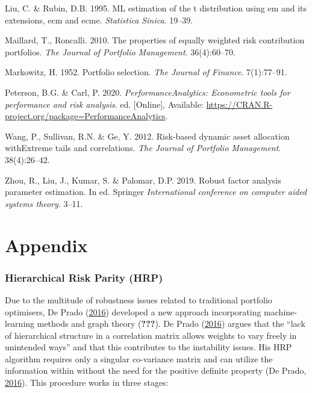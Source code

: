 \documentclass[11pt,preprint, authoryear]{elsarticle}
\numberwithin{equation}{section}
\numberwithin{figure}{section}
\numberwithin{table}{section}
\begin{document}
\leavevmode\hypertarget{ref-liu1995}{}%
Liu, C. \& Rubin, D.B. 1995. ML estimation of the t distribution using
em and its extensions, ecm and ecme. \emph{Statistica Sinica}. 19--39.

\leavevmode\hypertarget{ref-maillard2010}{}%
Maillard, T., Roncalli. 2010. The properties of equally weighted risk
contribution portfolios. \emph{The Journal of Portfolio Management}.
36(4):60--70.

\leavevmode\hypertarget{ref-markowitz}{}%
Markowitz, H. 1952. Portfolio selection. \emph{The Journal of Finance}.
7(1):77--91.

\leavevmode\hypertarget{ref-PerformanceAnalytics}{}%
Peterson, B.G. \& Carl, P. 2020. \emph{PerformanceAnalytics: Econometric
tools for performance and risk analysis}. ed. {[}Online{]}, Available:
\url{https://CRAN.R-project.org/package=PerformanceAnalytics}.

\leavevmode\hypertarget{ref-wang2012}{}%
Wang, P., Sullivan, R.N. \& Ge, Y. 2012. Risk-based dynamic asset
allocation withExtreme tails and correlations. \emph{The Journal of
Portfolio Management}. 38(4):26--42.

\leavevmode\hypertarget{ref-zhou2019}{}%
Zhou, R., Liu, J., Kumar, S. \& Palomar, D.P. 2019. Robust factor
analysis parameter estimation. In ed. Springer \emph{International
conference on computer aided systems theory}. 3--11.

\newpage

\hypertarget{appendix}{%
\section*{Appendix}\label{appendix}}

\hypertarget{hierarchical-risk-parity-hrp}{%
\subsubsection{Hierarchical Risk Parity
(HRP)}\label{hierarchical-risk-parity-hrp}}

Due to the multitude of robustness issues related to traditional
portfolio optimisers, De Prado (\protect\hyperlink{ref-lopez}{2016})
developed a new approach incorporating machine-learning methods and
graph theory ({\textbf{???}}). De Prado
(\protect\hyperlink{ref-lopez}{2016}) argues that the ``lack of
hierarchical structure in a correlation matrix allows weights to vary
freely in unintended ways'' and that this contributes to the instability
issues. His HRP algorithm requires only a singular co-variance matrix
and can utilize the information within without the need for the positive
definite property (De Prado, \protect\hyperlink{ref-lopez}{2016}). This
procedure works in three stages:
\end{document}
